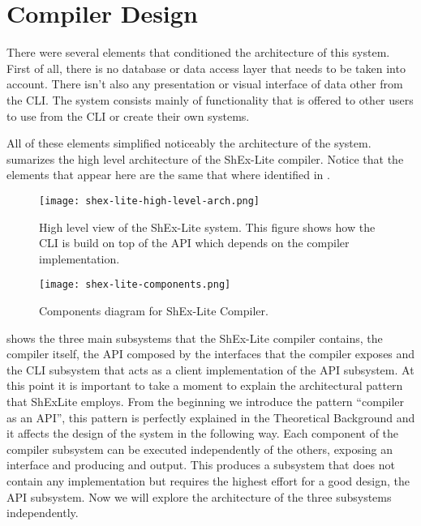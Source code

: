 \section{Compiler Design}
There were several elements that conditioned the architecture of this system. First of all,
there is no database or data access layer that needs to be taken into account. There isn’t
also any presentation or visual interface of data other from the CLI. The system consists
mainly of functionality that is offered to other users to use from the CLI or create their own
systems. 

All of these elements simplified noticeably the architecture of the system.  sumarizes the high level architecture of the ShEx-Lite compiler. Notice that the elements that appear here are the same that where identified in .

\begin{figure}[hb]
    \texttt{[image: shex-lite-high-level-arch.png]}
    \caption[High level view of the ShEx-Lite system]{High level view of the ShEx-Lite system. This figure shows how the CLI is build on top of the API which depends on the compiler implementation.}
\end{figure}

\begin{figure}[hb]
    \texttt{[image: shex-lite-components.png]}
    \caption[Components diagram for ShEx-Lite Compiler]{Components diagram for ShEx-Lite Compiler.}
\end{figure}

 shows the three main subsystems that the ShEx-Lite compiler contains, the
compiler itself, the API composed by the interfaces that the compiler exposes and the CLI
subsystem that acts as a client implementation of the API subsystem.
At this point it is important to take a moment to explain the architectural pattern that ShExLite employs. From the beginning we introduce the pattern “compiler as an API”, this
pattern is perfectly explained in the Theoretical Background and it affects the design of the
system in the following way.
Each component of the compiler subsystem can be executed independently of the others,
exposing an interface and producing and output. This produces a subsystem that does not
contain any implementation but requires the highest effort for a good design, the API
subsystem.
Now we will explore the architecture of the three subsystems independently.

